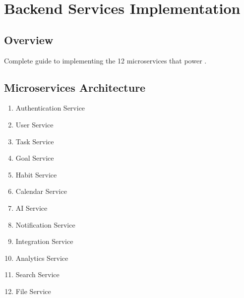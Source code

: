 \chapter{Backend Services Implementation}
\label{ch:backend-services}

\section{Overview}
Complete guide to implementing the 12 microservices that power \lifeos{}.

\section{Microservices Architecture}
\begin{enumerate}
    \item Authentication Service
    \item User Service
    \item Task Service
    \item Goal Service
    \item Habit Service
    \item Calendar Service
    \item AI Service
    \item Notification Service
    \item Integration Service
    \item Analytics Service
    \item Search Service
    \item File Service
\end{enumerate}


